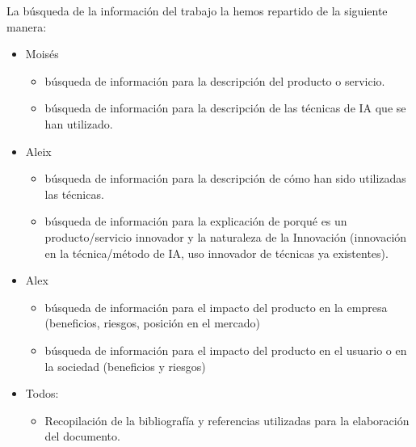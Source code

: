 La búsqueda de la información del trabajo la hemos repartido de la siguiente manera:
\begin{itemize}
\item Moisés
    \begin{itemize}
\item búsqueda de información para la descripción del producto o servicio.
\item búsqueda de información para la descripción de las técnicas de IA que se han utilizado.
    \end{itemize}
\item Aleix
    \begin{itemize}
\item búsqueda de información para la descripción de cómo han sido utilizadas las técnicas.
\item búsqueda de información para la explicación de porqué es un producto/servicio innovador y la naturaleza de la Innovación (innovación en la técnica/método de IA, uso innovador de técnicas ya existentes).
    \end{itemize}
\item Alex
    \begin{itemize}
\item búsqueda de información para el impacto del producto en la empresa (beneficios, riesgos, posición en el mercado)
\item búsqueda de información para el impacto del producto en el usuario o en la sociedad (beneficios y riesgos)
    \end{itemize}
\item Todos:
    \begin{itemize}
\item Recopilación de la bibliografía y referencias utilizadas para la elaboración del documento.
    \end{itemize}
    
\end{itemize}


